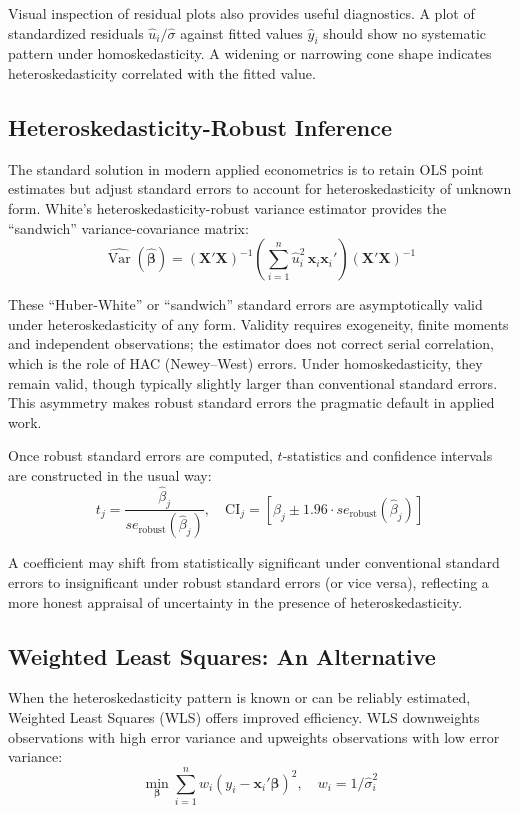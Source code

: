 Visual inspection of residual plots also provides useful diagnostics. A plot of standardized residuals $\hat{u}_i/\hat{\sigma}$ against fitted values $\hat{y}_i$ should show no systematic pattern under homoskedasticity. A widening or narrowing cone shape indicates heteroskedasticity correlated with the fitted value.

\subsection{Heteroskedasticity-Robust Inference}\label{sec:hc-robust}

The standard solution in modern applied econometrics is to retain OLS point estimates but adjust standard errors to account for heteroskedasticity of unknown form. White's heteroskedasticity-robust variance estimator provides the ``sandwich'' variance-covariance matrix:
$$\widehat{\operatorname{Var}}(\hat{\boldsymbol{\beta}}) = (\mathbf{X}'\mathbf{X})^{-1} \left(\sum_{i=1}^n \hat{u}_i^2\, \mathbf{x}_i\mathbf{x}_i'\right) (\mathbf{X}'\mathbf{X})^{-1}$$

These ``Huber-White'' or ``sandwich'' standard errors are asymptotically valid under heteroskedasticity of any form. Validity requires exogeneity, finite moments and independent observations; the estimator does not correct serial correlation, which is the role of HAC (Newey--West) errors. Under homoskedasticity, they remain valid, though typically slightly larger than conventional standard errors. This asymmetry makes robust standard errors the pragmatic default in applied work.

Once robust standard errors are computed, $t$-statistics and confidence intervals are constructed in the usual way:
$$t_j = \frac{\hat{\beta}_j}{se_{\text{robust}}(\hat{\beta}_j)}, \quad \text{CI}_j = \left[\hat{\beta}_j \pm 1.96 \cdot se_{\text{robust}}(\hat{\beta}_j)\right]$$

A coefficient may shift from statistically significant under conventional standard errors to insignificant under robust standard errors (or vice versa), reflecting a more honest appraisal of uncertainty in the presence of heteroskedasticity.
\subsection{Weighted Least Squares: An Alternative}

When the heteroskedasticity pattern is known or can be reliably estimated, Weighted Least Squares (WLS) offers improved efficiency. WLS downweights observations with high error variance and upweights observations with low error variance:
$$\min_{\boldsymbol{\beta}} \sum_{i=1}^n w_i (y_i - \mathbf{x}_i'\boldsymbol{\beta})^2, \quad w_i = 1/\hat{\sigma}_i^2$$

